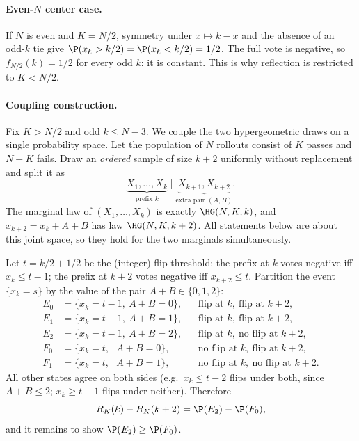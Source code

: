 \paragraph{Even-$N$ center case.}
If $N$ is even and $K=N/2$, symmetry under $x\mapsto k-x$ and the absence of
an odd-$k$ tie give $\P(x_k>k/2)=\P(x_k<k/2)=1/2$. The full vote is negative,
so $f_{N/2}(k)=1/2$ for every odd $k$: it is constant. This is why reflection
is restricted to $K<N/2$.

\paragraph{Coupling construction.}
Fix $K>N/2$ and odd $k\le N-3$. We couple the two hypergeometric draws on a
single probability space. Let the population of $N$ rollouts consist of $K$
passes and $N-K$ fails. Draw an \emph{ordered} sample of size $k+2$ uniformly
without replacement and split it as
\[
\underbrace{X_1,\dots,X_k}_{\text{prefix }k}\;\Big|\;
\underbrace{X_{k+1},X_{k+2}}_{\text{extra pair }(A,B)} .
\]
The marginal law of $(X_1,\dots,X_k)$ is exactly $\HG(N,K,k)$, and
$x_{k+2}=x_k+A+B$ has law $\HG(N,K,k+2)$. All statements below are about this
joint space, so they hold for the two marginals simultaneously.

Let $t=k/2+1/2$ be the (integer) flip threshold: the prefix at $k$ votes
negative iff $x_k\le t-1$; the prefix at $k+2$ votes negative iff
$x_{k+2}\le t$. Partition the event $\{x_k=s\}$ by the value of the pair
$A+B\in\{0,1,2\}$:
\[
\begin{aligned}
E_0&=\{x_k=t-1,\ A+B=0\}, &&\text{flip at }k,\ \text{flip at }k+2,\\
E_1&=\{x_k=t-1,\ A+B=1\}, &&\text{flip at }k,\ \text{flip at }k+2,\\
E_2&=\{x_k=t-1,\ A+B=2\}, &&\text{flip at }k,\ \text{no flip at }k+2,\\
F_0&=\{x_k=t,\ \ \ A+B=0\}, &&\text{no flip at }k,\ \text{flip at }k+2,\\
F_1&=\{x_k=t,\ \ \ A+B=1\}, &&\text{no flip at }k,\ \text{no flip at }k+2.
\end{aligned}
\]
All other states agree on both sides (e.g.\ $x_k\le t-2$ flips under both, since
$A+B\le2$; $x_k\ge t+1$ flips under neither). Therefore
\begin{equation}
\label{eq:rdiff}
R_K(k)-R_K(k+2)=\P(E_2)-\P(F_0),
\end{equation}
and it remains to show $\P(E_2)\ge\P(F_0)$.

